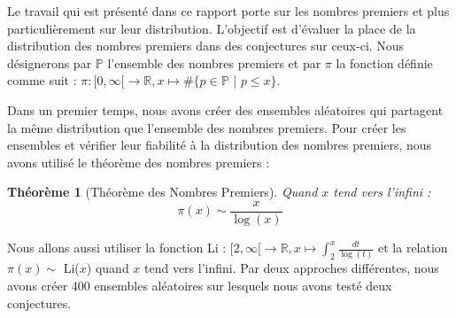 \documentclass[../main.tex]{subfile}
\begin{document}
\theoremstyle{plain}
\newtheorem{Thm}{Théorème}

Le travail qui est présenté dans ce rapport porte sur les nombres premiers et plus particulièrement sur leur distribution. L'objectif est d'évaluer la place de la distribution des nombres premiers dans des conjectures sur ceux-ci. Nous désignerons par $\mathbb{P}$ l'ensemble des nombres premiers et par $\pi$ la fonction définie comme suit : $\pi : [0, \infty [ \rightarrow \mathbb{R}, x \mapsto \# \{p \in \mathbb{P}$ | $p \leqslant x\}$. 

Dans un premier temps, nous avons créer des ensembles aléatoires qui partagent la même distribution que l'ensemble des nombres premiers. Pour créer les ensembles et vérifier leur fiabilité à la distribution des nombres premiers, nous avons utilisé le théorème des nombres premiers : 
\begin{Thm}[Théorème des Nombres Premiers]
\label{TNP}
	Quand $x$ tend vers l'infini : 
	\[ \pi(x) \sim \frac{x}{\log(x)}  \] 
\end{Thm}
Nous allons aussi utiliser la fonction Li : $ [2, \infty [ \rightarrow \mathbb{R}, x \mapsto \int_{2}^{x} \frac{dt}{\log(t)} $ et la relation $\pi(x) \sim$ Li($x$) quand $x$ tend vers l'infini.  Par deux approches différentes, nous avons créer 400 ensembles aléatoires sur lesquels nous avons testé deux conjectures. 
 
\clearpage
\end{document}
